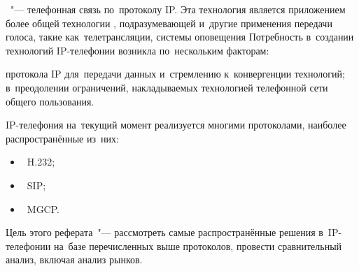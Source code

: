 
~"--- телефонная связь по~протоколу IP.
Эта технология является приложением более общей технологии , подразумевающей и~другие применения передачи голоса, такие как~телетрансляции, системы оповещения \etc
Потребность в~создании технологий IP-телефонии возникла по~нескольким факторам:\listnopagebreak
\begin{itemize}
     протокола IP для~передачи данных и~стремлению к~конвергенции технологий;
		 в~преодолении ограничений, накладываемых технологией телефонной сети общего пользования.
\end{itemize}

IP-телефония на~текущий момент реализуется многими протоколами, наиболее распространённые из~них:\listnopagebreak
\begin{itemize}
    \item\ H.232;
		\item\ SIP;
		\item\ MGCP.
\end{itemize}

Цель этого реферата~"--- рассмотреть самые распространённые решения в~IP-телефонии на~базе перечисленных выше протоколов, провести сравнительный анализ, включая анализ рынков.